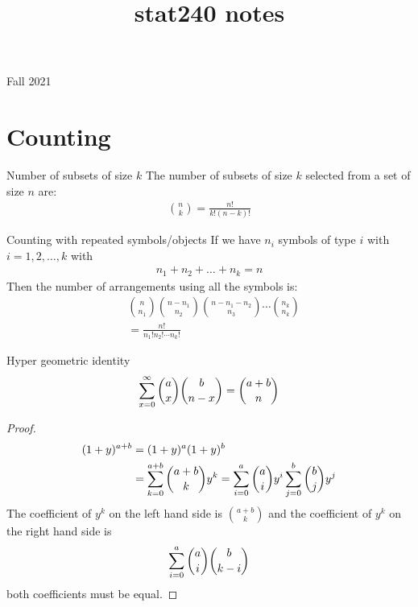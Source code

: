 \documentclass[16pt,a4paper]{article}
\title{ stat240 notes}
\date{}
\begin{document}
\maketitle
\begin{center}
    Fall 2021
\end{center}
\newpage
\section{Counting}
\begin{thm}{Number of subsets of size $k$}
    The number of subsets of size $k$ selected from a set of size $n$ are:
    \begin{align*}
        {n \choose k} = \frac{n!}{k!(n-k)!}
    \end{align*}
\end{thm}
\begin{thm}{Counting with repeated symbols/objects}
    If we have $n_i$ symbols of type $i$ with $i=1,2, \ldots, k$ with \begin{align*}
        n_1 + n_2 + \ldots + n_k = n
    \end{align*}
    Then the number of arrangements using all the symbols is: 
    \begin{align*}
        &{n\choose n_1}{n-n_1 \choose n_2}{n-n_1-n_2 \choose n_3} \cdots {n_k \choose n_k}\\
        &= \frac{n!}{n_1!n_2!\cdots n_k!}
    \end{align*} 
\end{thm}

\begin{thm}{Hyper geometric identity}
    \begin{align*}
        \sum\limits_{x=0}^{\infty}{a\choose x}{b \choose n-x} = {a+b\choose n}
    \end{align*}
    \begin{proof}
        \begin{align*}
            (1+y)^{a+b} &= (1+y)^a(1+y)^b\\
            &= \sum\limits_{k=0}^{a+b}{a+b\choose k}y^k = \sum\limits_{i=0}^{a}{a\choose i}y^i\sum\limits_{j=0}^{b}{b\choose j}y^j
        \end{align*}
        The coefficient of $y^k$ on the left hand side is ${a+b\choose k}$ and the coefficient of $y^k$ on the right hand side is 
        \begin{align*}
            \sum\limits_{i=0}^{a}{a\choose i}{b\choose k-i}
        \end{align*}
        both coefficients must be equal. 
    \end{proof}
\end{thm}
\end{document}

